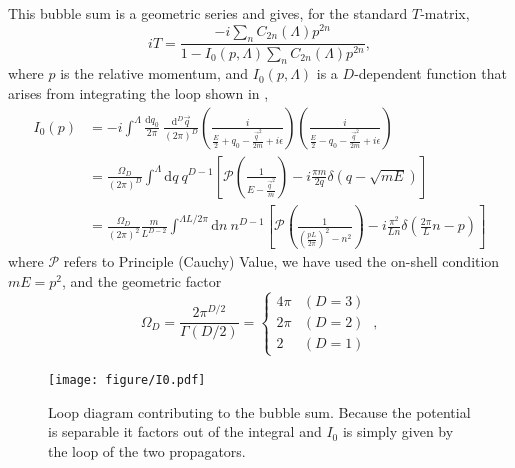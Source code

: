 This bubble sum is a geometric series and gives, for the standard $T$-matrix, \cite{Kaplan:1998we,Beane:2003da}
\begin{equation}\label{eq:T matrix}
iT = \frac{-i\sum_n C_{2n}(\Lambda) p^{2n}}{1-I_0(p,\Lambda) \sum_n C_{2n}(\Lambda) p^{2n}},
\end{equation}
where $p$ is the relative momentum,  and $I_0(p,\Lambda)$ is a $D$-dependent function that arises from integrating the loop shown in ,
\begin{align}
    I_0(p)
    &=-i\int^{\Lambda}
        \frac { \mathrm {d}q_0}{2\pi}\ \frac{\mathrm { d } ^ { D } \vec{ q } } { (2\pi)^ { D } }
        \left( \frac { i } { \frac{E}{2} + q _ { 0 } - \frac{\vec{q}^2}{2m} + i \epsilon } \right)
        \left( \frac { i } { \frac{E}{2} - q _ { 0 } - \frac{\vec{q}^2}{2m} + i \epsilon } \right)
    \nonumber\\
    &=\frac{\Omega_D}{(2\pi)^D}\int^{\Lambda}  \mathrm { d } q \ q^{D-1}\left[\mathcal{P} \left( \frac { 1 } { E - \frac{\vec{q}^2}{m} } \right)
-i\frac{\pi m}{2q}\delta(q-\sqrt{mE})\right]
    \\
    &=\frac{\Omega_D}{(2\pi)^2}\frac{m}{L^{D-2}}\int^{\Lambda L/2\pi}  \mathrm { d } n \ n^{D-1}\left[\mathcal{P} \left( \frac { 1 } { \left(\frac{pL}{2\pi}\right)^2 - n^2 } \right)
-i\frac{\pi^2}{L n}\delta\left(\frac{2\pi}{L}n -p\right)\right]
    \label{eq:I0}
\end{align}
where $\mathcal{P}$ refers to Principle (Cauchy) Value, we have used the on-shell condition $mE=p^2$, and the geometric factor
\begin{equation}
\Omega_D=\frac{2\pi^{D/2}}{\Gamma(D/2)}=
    \begin{cases}
        4\pi    &   (D=3)\\
        2\pi    &   (D=2)\\
        2       &   (D=1)
    \end{cases}\ ,
\end{equation}

\begin{figure}[h!]
    \center
    \texttt{[image: figure/I0.pdf]}
    \caption{
        Loop diagram contributing to the bubble sum.
        Because the potential is separable it factors out of the integral and $I_0$ is simply given by the loop of the two propagators.
    }
    \label{fig:I0}
\end{figure}

